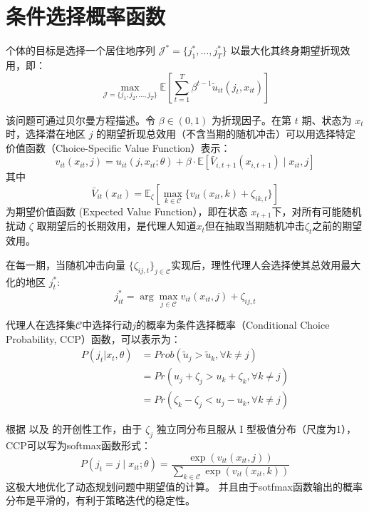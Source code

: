 \documentclass[master, final]{zufe-thesis}
\begin{document}
\section{条件选择概率函数}

个体的目标是选择一个居住地序列 $\mathcal{J}^* = \{j_1^*, \dots, j_T^*\}$ 以最大化其终身期望折现效用，即：
\begin{equation}
  \max_{\mathcal{J}=\{j_1,j_2,\ldots,j_T\}} \mathbb{E} \left[ \sum_{t=1}^{T} \beta^{t-1} \tilde{u}_{it}(j_t,x_{it}) \right]
\end{equation}

该问题可通过贝尔曼方程描述。令 $\beta \in (0,1)$ 为折现因子。在第 $t$ 期、状态为 $x_t$ 时，选择潜在地区 $j$ 的期望折现总效用（不含当期的随机冲击）可以用选择特定价值函数（Choice-Specific Value Function）表示：
\begin{equation}
v_{it}(x_{it}, j) = u_{it}(j, x_{it}; \theta) + \beta \cdot \mathbb{E} \left[\bar{V}_{i,t+1}(x_{i,t+1}) \mid x_{it}, j \right]
\end{equation}
其中
\begin{equation}
\bar{V}_{it}(x_{it}) = \mathbb{E}_{\zeta} \left[ \max_{k \in \mathcal{C}} \{ v_{it}(x_{it}, k) + \zeta_{ik,t} \} \right]
\end{equation}
为期望价值函数 (Expected Value Function），即在状态 $x_{t+1}$下，对所有可能随机扰动 $\zeta$ 取期望后的长期效用，是代理人知道$x_t$但在抽取当期随机冲击$\zeta_t$之前的期望效用。

在每一期，当随机冲击向量 $\{\zeta_{ij,t}\}_{j \in \mathcal{C}}$实现后，理性代理人会选择使其总效用最大化的地区 $j_t^*$:
\begin{equation}
j_{it}^* = \arg\max_{j \in \mathcal{C}} { v_{it}(x_{it}, j) + \zeta_{ij,t} }
\end{equation}

代理人在选择集$\mathcal{C}$中选择行动$j$的概率为条件选择概率（Conditional Choice Probability, CCP）函数，可以表示为：
\begin{equation}
\begin{split}
    P(j_t|x_t,\theta)&=Prob(\tilde u_j > \tilde u_k, \forall k \neq j)
    \\&=Pr(u_j+\zeta_j>u_k+\zeta_k, \forall k \neq j)
    \\&=Pr(\zeta_k-\zeta_j<u_j-u_k, \forall k \neq j)
\end{split}  
\label{eq:C中地点选择j的概率}
\end{equation}


根据\textcite{rustOptimalReplacementGMC1987} 以及\textcite{hotzConditionalChoiceProbabilities1993} 的开创性工作，由于 $\zeta_j$ 独立同分布且服从 I 型极值分布（尺度为1），CCP可以写为softmax函数形式：
\begin{equation}
P(j_t = j \mid x_{it}; \theta) = \frac{\exp(v_{it}(x_{it}, j))}{\sum_{k \in \mathcal{C}} \exp(v_{it}(x_{it}, k))}
\label{eq:地点选择概率}
\end{equation}
这极大地优化了动态规划问题中期望值的计算。
并且由于sotfmax函数输出的概率分布是平滑的，有利于策略迭代的稳定性。
\end{document}
